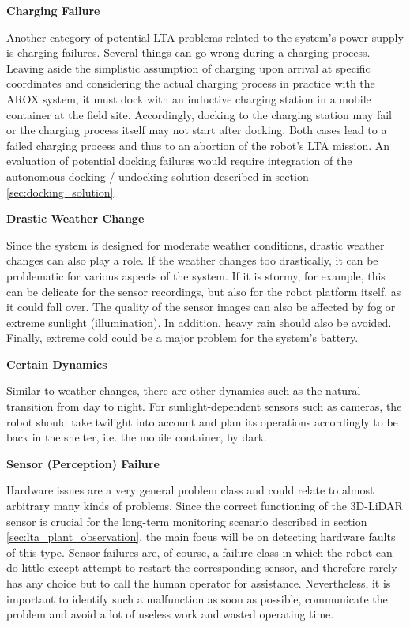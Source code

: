 \documentclass[english, master, utf8]{base/thesis_KBS}
\begin{document}
\noindent
\textbf{Charging Failure}\newline

\noindent
Another category of potential LTA problems related to the system's power supply is charging failures. Several things can go wrong during a charging process. 
Leaving aside the simplistic assumption of charging upon arrival at specific coordinates and considering the actual charging process 
in practice with the AROX system, it must dock with an inductive charging station in a mobile container at the field site.
Accordingly, docking to the charging station may fail or the charging process itself may not start after docking.
Both cases lead to a failed charging process and thus to an abortion of the robot's LTA mission. An evaluation of potential docking failures would require 
integration of the autonomous docking / undocking solution described in section \ref{sec:docking_solution}.\newline

\noindent
\textbf{Drastic Weather Change}\newline

\noindent
Since the system is designed for moderate weather conditions, drastic weather changes can also play a role.
If the weather changes too drastically, it can be problematic for various aspects of the system.
If it is stormy, for example, this can be delicate for the sensor recordings, but also for the robot platform itself, as it could fall over.
The quality of the sensor images can also be affected by fog or extreme sunlight (illumination).
In addition, heavy rain should also be avoided. Finally, extreme cold could be a major problem for the system's battery.\newline

\noindent
\textbf{Certain Dynamics}\newline

\noindent
Similar to weather changes, there are other dynamics such as the natural transition from day to night. For sunlight-dependent sensors such as cameras, 
the robot should take twilight into account and plan its operations accordingly to be back in the shelter, i.e. the mobile container, by dark.\newline

\noindent
\textbf{Sensor (Perception) Failure}\newline

\noindent
Hardware issues are a very general problem class and could relate to almost arbitrary many kinds of problems. Since the correct functioning of the 3D-LiDAR sensor is
crucial for the long-term monitoring scenario described in section \ref{sec:lta_plant_observation}, the main focus will be on detecting hardware faults of this type. 
Sensor failures are, of course, a failure class in which the robot can do little except attempt to restart the corresponding sensor, and therefore rarely has any choice but to 
call the human operator for assistance. Nevertheless, it is important to identify such a malfunction as soon as possible, communicate the problem and avoid a lot of useless work 
and wasted operating time.\newline
\end{document}
